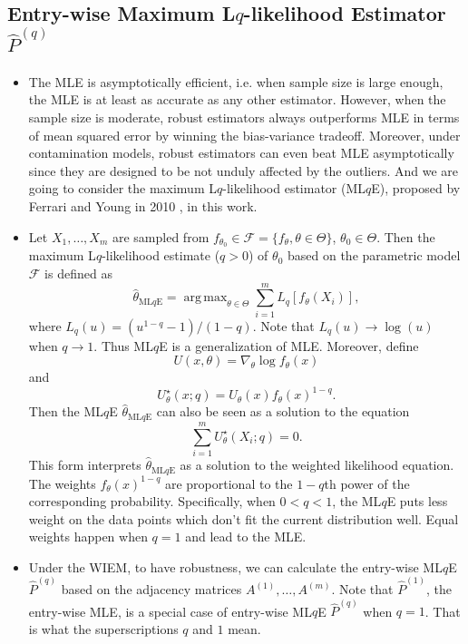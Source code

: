 \documentclass[a4paper]{article}
\DeclareMathOperator*{\argmax}{arg\,max}
\renewcommand{\hat}{\widehat}
\begin{document}
\subsection{Entry-wise Maximum L$q$-likelihood Estimator $\hat{P}^{(q)}$}
\begin{itemize}
\item The MLE is asymptotically efficient, i.e. when sample size is large enough, the MLE is at least as accurate as any other estimator. However, when the sample size is moderate, robust estimators always outperforms MLE in terms of mean squared error by winning the bias-variance tradeoff. Moreover, under contamination models, robust estimators can even beat MLE asymptotically since they are designed to be not unduly affected by the outliers. And we are going to consider the maximum L$q$-likelihood estimator (ML$q$E), proposed by Ferrari and Young in 2010 \cite{ferrari2010}, in this work.
\item Let $X_1, \dotsc, X_m$ are sampled from $f_{\theta_0} \in \mathcal{F} = \{ f_{\theta}, \theta \in \Theta \}$, $\theta_0 \in \Theta$. Then the maximum L$q$-likelihood estimate ($q > 0$) of $\theta_0$ based on the parametric model $\mathcal{F}$ is defined as
\[
	\hat{\theta}_{\mathrm{ML}q\mathrm{E}} = \argmax_{\theta \in \Theta} \sum_{i=1}^m L_q[f_{\theta}(X_i)],
\]
where $L_q(u) = (u^{1-q} - 1)/(1- q)$.
Note that $L_q(u) \to \log(u)$ when $q \to 1$. Thus ML$q$E is a generalization of MLE.
Moreover, define
\[
	U(x, \theta) = \nabla_{\theta} \log f_{\theta}(x)
\]
and
\[
	U^{\star}_{\theta}(x; q) = U_{\theta}(x) f_{\theta}(x)^{1-q}.
\]
Then the ML$q$E $\hat{\theta}_{\mathrm{ML}q\mathrm{E}}$ can also be seen as a solution to the equation
\[
	\sum_{i=1}^m U^{\star}_{\theta}(X_i; q) = 0.
\]
This form interprets $\hat{\theta}_{\mathrm{ML}q\mathrm{E}}$ as a solution to the weighted likelihood equation. The weights $f_{\theta}(x)^{1-q}$ are proportional to the $1-q$th power of the corresponding probability. Specifically, when $0 < q < 1$, the ML$q$E puts less weight on the data points which don't fit the current distribution well. Equal weights happen when $q=1$ and lead to the MLE.
\item Under the WIEM, to have robustness, we can calculate the entry-wise ML$q$E $\hat{P}^{(q)}$ based on the adjacency matrices $A^{(1)}, \dotsc, A^{(m)}$. Note that $\hat{P}^{(1)}$, the entry-wise MLE, is a special case of entry-wise ML$q$E $\hat{P}^{(q)}$ when $q = 1$. That is what the superscriptions $q$ and $1$ mean.
\end{itemize}
\end{document}
